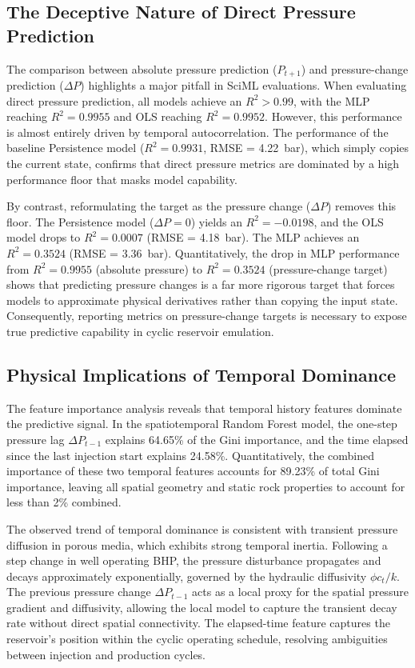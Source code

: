 \documentclass[10pt,twocolumn]{article}
\begin{document}
\subsection{The Deceptive Nature of Direct Pressure Prediction}
The comparison between absolute pressure prediction ($P_{t+1}$) and pressure-change prediction ($\Delta P$) highlights a major pitfall in SciML evaluations. When evaluating direct pressure prediction, all models achieve an $R^2 > 0.99$, with the MLP reaching $R^2 = 0.9955$ and OLS reaching $R^2 = 0.9952$. However, this performance is almost entirely driven by temporal autocorrelation. The performance of the baseline Persistence model ($R^2 = 0.9931$, RMSE = 4.22~bar), which simply copies the current state, confirms that direct pressure metrics are dominated by a high performance floor that masks model capability.

By contrast, reformulating the target as the pressure change ($\Delta P$) removes this floor. The Persistence model ($\Delta P = 0$) yields an $R^2 = -0.0198$, and the OLS model drops to $R^2 = 0.0007$ (RMSE = 4.18~bar). The MLP achieves an $R^2 = 0.3524$ (RMSE = 3.36~bar). Quantitatively, the drop in MLP performance from $R^2 = 0.9955$ (absolute pressure) to $R^2 = 0.3524$ (pressure-change target) shows that predicting pressure changes is a far more rigorous target that forces models to approximate physical derivatives rather than copying the input state. Consequently, reporting metrics on pressure-change targets is necessary to expose true predictive capability in cyclic reservoir emulation.

\subsection{Physical Implications of Temporal Dominance}
The feature importance analysis reveals that temporal history features dominate the predictive signal. In the spatiotemporal Random Forest model, the one-step pressure lag $\Delta P_{t-1}$ explains 64.65\% of the Gini importance, and the time elapsed since the last injection start explains 24.58\%. Quantitatively, the combined importance of these two temporal features accounts for 89.23\% of total Gini importance, leaving all spatial geometry and static rock properties to account for less than 2\% combined.

The observed trend of temporal dominance is consistent with transient pressure diffusion in porous media, which exhibits strong temporal inertia. Following a step change in well operating BHP, the pressure disturbance propagates and decays approximately exponentially, governed by the hydraulic diffusivity $\phi c_t / k$. The previous pressure change $\Delta P_{t-1}$ acts as a local proxy for the spatial pressure gradient and diffusivity, allowing the local model to capture the transient decay rate without direct spatial connectivity. The elapsed-time feature captures the reservoir's position within the cyclic operating schedule, resolving ambiguities between injection and production cycles.
\end{document}
